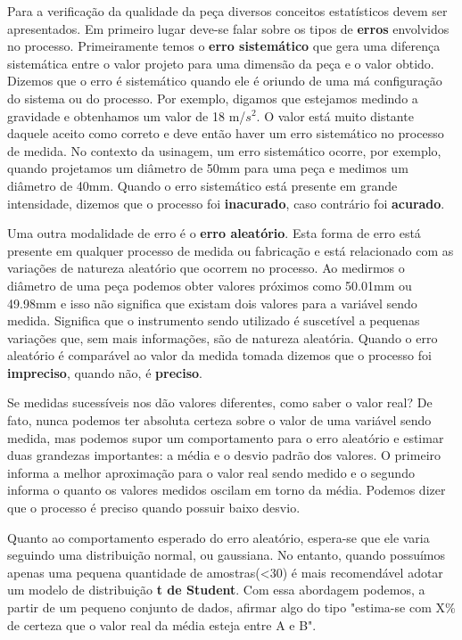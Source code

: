  
 Para a verificação da qualidade da peça diversos conceitos estatísticos devem ser apresentados. Em primeiro lugar deve-se falar sobre os tipos de \textbf{erros} envolvidos no processo. Primeiramente temos o \textbf{erro sistemático} que gera uma diferença sistemática entre  o valor projeto para uma dimensão da peça e o valor obtido. Dizemos que o erro é sistemático quando ele é oriundo de uma má configuração
 do sistema ou do processo. Por exemplo, digamos que estejamos medindo a gravidade e obtenhamos um valor de 18 m/$s^2$. O valor está muito distante daquele aceito como correto e deve então haver um erro sistemático no processo de medida. No contexto da usinagem, um erro sistemático ocorre, por exemplo, quando projetamos um diâmetro de 50mm para uma peça e medimos um diâmetro de 40mm. Quando o erro sistemático está presente em grande intensidade, dizemos que o processo foi \textbf{inacurado}, caso contrário foi \textbf{acurado}.
 
 
Uma outra modalidade de erro é o \textbf{erro aleatório}. Esta forma de erro está presente em qualquer processo de medida ou fabricação e está relacionado com as variações de natureza aleatório que ocorrem no processo. Ao medirmos o diâmetro de uma peça podemos obter valores próximos como 50.01mm ou 49.98mm e isso não significa que existam dois valores para a variável sendo medida. Significa que 
o instrumento sendo utilizado é suscetível a pequenas variações que, sem mais informações, são de natureza aleatória. Quando o erro aleatório é comparável ao valor da medida tomada dizemos que o processo foi\textbf{ impreciso}, quando não, é \textbf{preciso}.


Se medidas sucessíveis nos dão valores diferentes, como saber o valor real? De fato, nunca podemos ter absoluta certeza sobre o valor de uma variável sendo medida, mas podemos supor um comportamento para o erro aleatório e estimar duas grandezas importantes: a média e o desvio padrão dos valores. O primeiro informa a melhor aproximação para o valor real sendo medido e o segundo informa o quanto os valores medidos oscilam em torno da média. Podemos dizer que o processo é preciso quando possuir baixo desvio.


 Quanto ao comportamento esperado do erro aleatório, espera-se que ele varia seguindo uma distribuição normal, ou gaussiana.
No entanto, quando possuímos apenas uma pequena quantidade de amostras(<30) é mais recomendável adotar um modelo de distribuição \textbf{t de Student}. Com essa abordagem podemos, a partir de um pequeno conjunto de dados, afirmar algo do tipo "estima-se com X\% de
certeza que o valor real da média esteja entre A e B".



